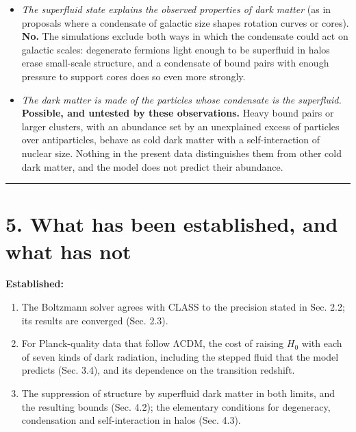 \documentclass[
  10pt,
]{article}
\providecommand{\tightlist}{%
  \setlength{\itemsep}{0pt}\setlength{\parskip}{0pt}}
\begin{document}
\begin{itemize}
\tightlist
\item
  \emph{The superfluid state explains the observed properties of dark
  matter} (as in proposals where a condensate of galactic size shapes
  rotation curves or cores). \textbf{No.} The simulations exclude both
  ways in which the condensate could act on galactic scales: degenerate
  fermions light enough to be superfluid in halos erase small-scale
  structure, and a condensate of bound pairs with enough pressure to
  support cores does so even more strongly.
\item
  \emph{The dark matter is made of the particles whose condensate is the
  superfluid.} \textbf{Possible, and untested by these observations.}
  Heavy bound pairs or larger clusters, with an abundance set by an
  unexplained excess of particles over antiparticles, behave as cold
  dark matter with a self-interaction of nuclear size. Nothing in the
  present data distinguishes them from other cold dark matter, and the
  model does not predict their abundance.
\end{itemize}

\begin{center}\rule{0.5\linewidth}{0.5pt}\end{center}

\hypertarget{what-has-been-established-and-what-has-not}{%
\section{5. What has been established, and what has
not}\label{what-has-been-established-and-what-has-not}}

\textbf{Established:}

\begin{enumerate}
\def\labelenumi{\arabic{enumi}.}
\tightlist
\item
  The Boltzmann solver agrees with CLASS to the precision stated in Sec.
  2.2; its results are converged (Sec. 2.3).
\item
  For Planck-quality data that follow ΛCDM, the cost of raising \(H_0\)
  with each of seven kinds of dark radiation, including the stepped
  fluid that the model predicts (Sec. 3.4), and its dependence on the
  transition redshift.
\item
  The suppression of structure by superfluid dark matter in both limits,
  and the resulting bounds (Sec. 4.2); the elementary conditions for
  degeneracy, condensation and self-interaction in halos (Sec. 4.3).
\end{enumerate}
\end{document}
